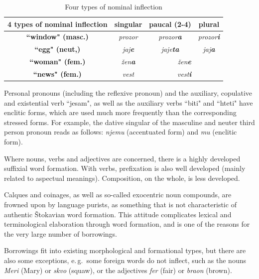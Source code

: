 {\begin{multicols}{2}
\begin{table}[ht]
\begin{center}
\renewcommand{\arraystretch}{2.2}
\setlength{\arrayrulewidth}{1pt}
\begin{tabular}{|c|c|c|c|}
\hline
{\textbf{4 types of nominal inflection}} & {\textbf{singular}} & {\textbf{paucal (2-4)}} & {\textbf{plural}} \\
\hline
{\textbf{``window" (masc.)}} & \textit{prozor} & \textit{prozor\textbf{a}} & \textit{prozor\textbf{i}} \\
\hline
{\textbf{``egg" (neut,)}} & \textit{jaj\textbf{e}} & \textit{jaje\textbf{ta}} & \textit{jaj\textbf{a}} \\
\hline
{\textbf{``woman" (fem.)}} & \textit{žen\textbf{a}} & \multicolumn{2}{c|}{\textit{žen\textbf{e}}} \\
\hline
{\textbf{``news" (fem.)}} & \textit{vest} &  \multicolumn{2}{c|}{\textit{vest\textbf{i}}} \\
\hline
\end{tabular}
\end{center}
\caption{Four types of nominal inflection}
 \label{nominal_inflection}
\end{table}

Personal pronouns (including the reflexive pronoun) and the auxiliary, copulative and existential verb ``jesam", as well as the auxiliary verbs ``biti" and ``hteti" have enclitic forms, which are used much more frequently than the corresponding stressed forms. For example, the dative singular of the masculine and neuter third person pronoun reads as follows:  \textit{njemu} (accentuated form) and  \textit{mu} (enclitic form).

Where nouns, verbs and adjectives are concerned, there is a highly developed suffixial word formation. With verbs, prefixation is also well developed (mainly related to aspectual meanings). Composition, on the whole, is less developed.

Calques and coinages, as well as so-called exocentric noun compounds, are frowned upon by language purists, as something that is not characteristic of authentic Štokavian word formation. This attitude complicates lexical and terminological elaboration through word formation, and is one of the reasons for the very large number of borrowings.

Borrowings fit into existing morphological and formational types, but there are also some exceptions, e.\,g.~some foreign words do not inflect, such as the nouns \textit{Meri}  (Mary) or \textit{skvo} (squaw), or the adjectives \textit{fer} (fair) or \textit{braon} (brown). 


\end{multicols}}
